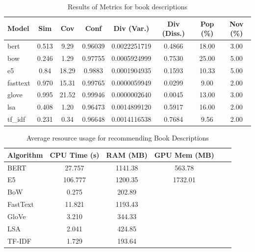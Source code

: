 \documentclass[\myFontSize,a4paper,oneside,hidelinks]{article}
\begin{document}
\begin{table}[H]
\centering
\large
\begin{tabular}{|l|c|c|c|c|c|c|c|}
\hline
\textbf{Model} & \textbf{Sim} & \textbf{Cov} & \textbf{Conf} & \textbf{Div (Var.)} & \textbf{Div (Diss.)} & \textbf{Pop (\%)} & \textbf{Nov (\%)} \\
\hline
bert     & 0.513 & 9.29  & 0.96039 & 0.0022251719 & 0.4866 & 18.00 & 3.00 \\
bow      & 0.246 & 1.29  & 0.97755 & 0.0005924999 & 0.7530 & 25.00 & 5.00 \\
e5 		& 0.84 & 18.29 & 0.9883 & 0.0001904935 & 0.1593 & 10.33 & 5.00 \\
fasttext & 0.970 & 15.31 & 0.99765 & 0.0000059949 & 0.0299 & 9.00  & 2.00 \\
glove    & 0.995 & 21.52 & 0.99946 & 0.0000002640 & 0.0045 & 13.00 & 3.00 \\
lsa      & 0.408 & 1.20  & 0.96473 & 0.0014899120 & 0.5917 & 16.00 & 2.00 \\
tf\_idf  & 0.231 & 0.34  & 0.96648 & 0.0014116538 & 0.7684 & 9.56  & 2.00 \\
\hline
\end{tabular}
\caption{Results of Metrics for book descriptions}
\label{tab:metrics_desc}
\end{table}







\begin{table}[H]
\centering
\begin{tabular}{lccccc}

\textbf{Algorithm} & \textbf{CPU Time (s)} & \textbf{RAM (MB)} & \textbf{GPU Mem (MB)}  \\
\hline
BERT     & 27.757 & 1141.38 & 563.78  \\
E5          & 106.777 & 1200.35 & 1732.01 \\
BoW      & 0.275  &  202.89 &  \\
FastText & 11.821 & 1193.43 &\\
GloVe    & 3.210  & 344.33  &\\
LSA      & 2.041  &   424.85  &\\
TF-IDF   & 1.729  &  193.64  &\\

\end{tabular}
\caption{Average resource usage for recommending Book Descriptions}
\label{tab:performance-desc}
\end{table}
\end{document}
